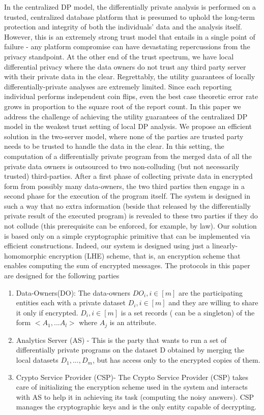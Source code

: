In the centralized DP model, the differentially private analysis is performed on a
trusted, centralized database platform that is presumed to uphold the long-term protection and integrity of both the individuals’
data and the analysis itself. However, this is an extremely strong trust model that entails in a single point of failure -  any platform compromise can have devastating repercussions from the privacy standpoint. At the other end of the trust spectrum, we have local differential privacy where the data owners do not trust any third party server with their private data in the clear. Regrettably, the utility guarantees of locally differentially-private
analyses are extremely limited. Since each reporting individual
performs independent coin flips, even the  best case theoretic error rate  grows in proportion to the square root of
the report count. In this paper we address the challenge of achieving the utility guarantees of the centralized DP model in the weakest trust setting of local DP analysis. 
 We propose an efficient solution in the
two-server model, where none of the parties are trusted party needs to be trusted to handle the data in the
clear. In this setting, the computation of a differentially private program from the merged data of all the private data owners is outsourced to
two non-colluding (but not necessarily trusted) third-parties. After a first phase of collecting
private data in encrypted form from possibly many data-owners, the two third parties then
engage in a second phase for the execution of the program itself. The system is designed in such a way that no extra information (beside that released by the differentially private  result of the executed program) is revealed to
these two parties if they do not collude (this prerequisite can be enforced, for example, by law).
Our solution is based only on a simple cryptographic primitive that can be implemented
via efficient constructions. Indeed, our system is designed using just a linearly-homomorphic
encryption (LHE) scheme, that is, an encryption scheme that enables computing the sum
of encrypted messages. 
 The protocols in this paper are designed
for the following parties\begin{enumerate}
 \item Data-Owners(DO): The data-owners $DO_i, i \in [m]$ are the participating entities each with  a
private dataset $D_i, i \in [m]$ and they are willing to share it only if encrypted. $D_i, i \in [m]$ is a set records ( can be a singleton) of the form $<A_1,...A_l>$ where $A_j$ is an attribute.  \item Analytics Server (AS) - This is the party that wants to run a set of differentially private programs  on the dataset D obtained by merging the local datasets $D_1, ... , D_m$, but has
access only to the encrypted copies of them. 
\item Crypto Service Provider (CSP)-
 The Crypto Service Provider (CSP) takes care of initializing the encryption scheme used
in the system and interacts with AS to help it in achieving its task (computing the
noisy answers). CSP manages the cryptographic keys and is the only entity
capable of decrypting.
\end{enumerate}
